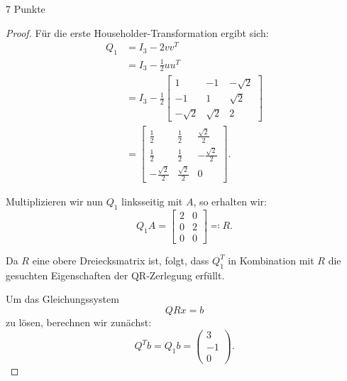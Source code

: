 \documentclass{problemset}
\begin{document}
\begin{problem}{7 Punkte}
\begin{proof}
    Für die erste Householder-Transformation ergibt sich:
    \begin{align*}
        Q_1 & = I_3 - 2 v v^T                                                                                \\
            & = I_3 - \frac{1}{2} u u^T                                                                      \\
            & = I_3 - \frac{1}{2} \begin{bmatrix}
                                      1         & -1       & -\sqrt{2} \\
                                      -1        & 1        & \sqrt{2}  \\
                                      -\sqrt{2} & \sqrt{2} & 2
                                  \end{bmatrix}                                           \\
            & = \begin{bmatrix}
                    \frac{1}{2}         & \frac{1}{2}        & \frac{\sqrt{2}}{2}  \\
                    \frac{1}{2}         & \frac{1}{2}        & -\frac{\sqrt{2}}{2} \\
                    -\frac{\sqrt{2}}{2} & \frac{\sqrt{2}}{2} & 0
                \end{bmatrix}.
    \end{align*}

    Multiplizieren wir nun \( Q_1 \) linksseitig mit \( A \), so erhalten wir:
    \begin{equation*}
        Q_1 A = \begin{bmatrix}
            2 & 0 \\
            0 & 2 \\
            0 & 0
        \end{bmatrix} \eqcolon R.
    \end{equation*}

    Da \( R \) eine obere Dreiecksmatrix ist, folgt, dass \( Q_1^T \) in
    Kombination mit \( R \) die gesuchten Eigenschaften der QR-Zerlegung
    erfüllt.

    Um das Gleichungssystem
    \begin{equation*}
        QRx = b
    \end{equation*}
    zu lösen, berechnen wir zunächst:
    \begin{equation*}
        Q^T b = Q_1 b = \begin{pmatrix}
            3 \\ -1 \\ 0
        \end{pmatrix}.
    \end{equation*}


\end{proof}
\end{problem}
\end{document}
